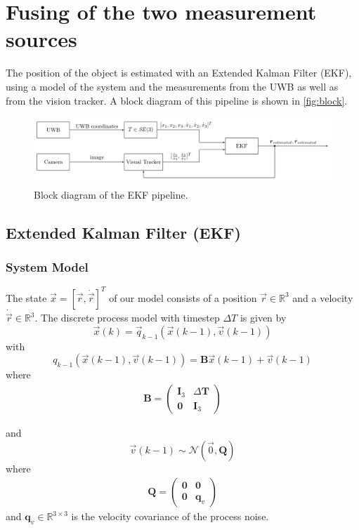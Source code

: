 \chapter{Fusing of the two measurement sources}\label{ch:fusing}

The position of the object is estimated with an Extended Kalman Filter (EKF), using a model of the system and the measurements from the UWB as well as from the vision tracker. A block diagram of this pipeline is shown in \autoref{fig:block}.

\begin{figure}[h]\centering
	\includegraphics[width=1.0\textwidth]{figures/blockdiagram_setup}
	\caption{Block diagram of the EKF pipeline.}\label{fig:block}
\end{figure}

\section{Extended Kalman Filter (EKF)}

\subsection{System Model}
The state $\vec x = [\vec r, \dot{\vec{r}}]^T$ of our model consists of a position $\vec r \in \mathbb{R}^3$ and a velocity $\dot{\vec r} \in \mathbb{R}^3$.
The discrete process model with timestep $\Delta T$ is given by
\begin{equation}
	\vec x(k) = \vec q_{k-1}(\vec x(k-1), \vec v(k-1))
\end{equation}
with
\begin{equation}
  q_{k-1}(\vec x(k-1), \vec v(k-1)) = \textbf{B} \vec x(k-1) + \vec v(k-1)
\end{equation}
where 
\begin{align}
	\textbf{B} =
	\begin{pmatrix}
		\textbf{I}_3 & \Delta \textbf{T}\\
		\textbf{0} & \textbf{I}_3
	\end{pmatrix}
\end{align} 

and
\begin{equation}
	\vec v(k-1) \sim \mathcal{N}(\vec 0, \textbf{Q})
\end{equation}
where
\begin{align}
	\textbf{Q} =
	\begin{pmatrix}
		\textbf{0} & \textbf{0}\\
		\textbf{0} & \textbf{q}_v
	\end{pmatrix}
\end{align}
and $\textbf{q}_v \in \mathbb{R}^{3\times3}$ is the velocity covariance of the process noise.

